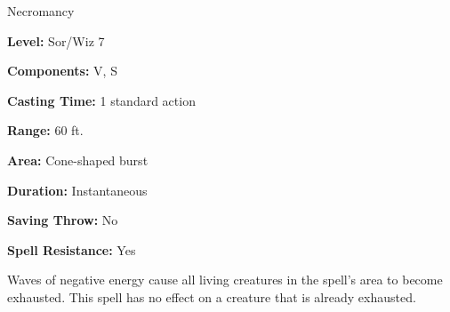 
Necromancy

\textbf{Level:} Sor/Wiz 7

\textbf{Components:} V, S

\textbf{Casting Time:} 1 standard action

\textbf{Range:} 60 ft.

\textbf{Area:} Cone-shaped burst

\textbf{Duration:} Instantaneous

\textbf{Saving Throw:} No

\textbf{Spell Resistance:} Yes

Waves of negative energy cause all living creatures in the spell's area to become 
exhausted. This spell has no effect on a creature that is already exhausted.

